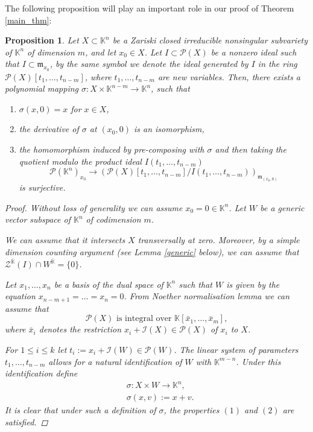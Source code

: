 \documentclass{amsart}
\theoremstyle{plain}
\newtheorem{prop}[thm]{Proposition}
\theoremstyle{definition}
\theoremstyle{remark}
\numberwithin{equation}{section}
\newcommand{\K}{\mathbb{K}}
\newcommand{\PP}{\mathcal{P}}
\newcommand{\I}{\mathcal{I}}
\newcommand{\Z}{\mathcal{Z}}
\begin{document}
The following proposition will play an important role in our proof of Theorem \ref{main_thm}:
\begin{prop}\label{alg_prop}
Let $X\subset \K^n$ be a Zariski closed irreducible nonsingular subvariety of $\K^n$ of dimension $m$, and let $x_0\in X$. Let $I\subset \PP(X)$ be a nonzero ideal such that $I\subset \mathfrak{m}_{x_0}$, by the same symbol we denote the ideal generated by $I$ in the ring $\PP(X)[t_1,\dots,t_{n-m}]$, where $t_1,\dots,t_{n-m}$ are new variables. Then, there exists a polynomial mapping $\sigma:X\times \K^{n-m}\rightarrow \K^n$, such that
\begin{enumerate}
    \item $\sigma(x,0)=x$ for $x\in X$,
    \item the derivative of $\sigma$ at $(x_0,0)$ is an isomorphism,
    \item the homomorphism induced by pre-composing with $\sigma$ and then taking the quotient modulo the product ideal $I(t_1,\dots,t_{n-m})$
    \begin{equation*}
        \PP(\K^n)_{x_0}\rightarrow (\PP(X)[t_1,\dots,t_{n-m}]/I(t_1,\dots,t_{n-m}))_{\mathfrak{m}_{(x_0,0)}}
    \end{equation*}
    is surjective.
\end{enumerate}
\begin{proof}
Without loss of generality we can assume $x_0=0\in\K^n$. Let $W$ be a generic vector subspace of $\K^n$ of codimension $m$. 


We can assume that it intersects $X$ transversally at zero. Moreover, by a simple dimension counting argument (see Lemma \ref{generic} below), we can assume that $\Z^{\overline{\K}}(I)\cap W^{\overline{\K}}=\{0\}$. 

Let $x_1,\dots,x_n$ be a basis of the dual space of $\K^n$ such that $W$ is given by the equation $x_{n-m+1}=\dots=x_n=0$. From Noether normalisation lemma we can assume that
\begin{equation}\label{finite_ext_eq}
	\PP(X) \text{ is integral over }\K[\bar{x}_1,\dots,\bar{x}_m],
\end{equation} 
where $\bar{x}_i$ denotes the restriction $x_i+\I(X)\in\PP(X)$ of $x_i$ to $X$.

For $1\leq i\leq k$ let $t_i:=x_i+\I(W)\in\PP(W)$. The linear system of parameters $t_1,\dots,t_{n-m}$ allows for a natural identification of $W$ with $\K^{m-n}$. Under this identification define
\begin{align*}
	&\sigma:X\times W\rightarrow \K^n,\\
	&\sigma(x,v):=x+v.
\end{align*}  
It is clear that under such a definition of $\sigma$, the properties $(1)$ and $(2)$ are satisfied. 



\end{proof}
\end{prop}
\end{document}

